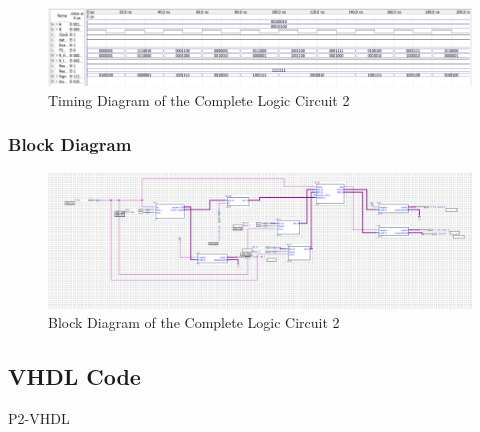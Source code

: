    \begin{figure}[H]
        \centering
        \includegraphics[width=15cm]{Pictures/ALU2WaveForm.png}
        \caption{{Timing Diagram of the Complete Logic Circuit 2}}
        \label{}
    \end{figure}

    \subsubsection{{Block Diagram}}

        \begin{figure}[H]
            \centering
            \includegraphics[width=15cm]{Pictures/P12BlockDia.png}
            \caption{{Block Diagram of the Complete Logic Circuit 2}}
            \label{}
        \end{figure}

\subsection{{VHDL Code}}

    {P2-VHDL}

